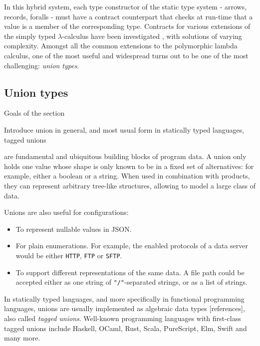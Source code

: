 \documentclass[sigplan,10pt,review,anonymous]{acmart}
\newcommand{\unsure}[2][1=]{}
\begin{document}
In this hybrid system, each type constructor of the static type system - arrows,
records, foralls - must have a contract counterpart that checks at run-time that
a value is a member of the corresponding type. Contracts for various
extensions of the simply typed $\lambda$-calculus have been investigated
\cite{BlameForAll, KeilThiemannUnionIntersection, RootCauseOfBlame,
DependentContracts, GradualTypingClasses}, with solutions of varying complexity.
Amongst all the common extensions to the polymorphic lambda calculus, one of the
most useful and widespread turns out to be one of the most challenging:
\emph{union types}.

\subsection{Union types}
{\color{red}Goals of the section

Introduce union in general, and most usual form in statically typed languages, tagged unions\vspace{0.5cm}}

 are fundamental and ubiquitous building blocks of program data. A union
only holds one value whose shape is only known to be in a fixed set of
alternatives: for example, either a boolean or a string. When used in combination
with products, they can represent arbitrary tree-like structures, allowing to
model a large class of data.

Unions are also useful for configurations:
\begin{itemize}
    \item To represent nullable values in JSON.
    \item For plain enumerations. For example, the enabled protocols of a data server
        would be either \lstinline+HTTP+, \lstinline+FTP+ or \lstinline+SFTP+.
    \item To support different representations of the same data. A file path could be
        accepted either as one string of \lstinline+"/"+-separated strings, or
        as a list of strings.
\end{itemize}

In statically typed languages, and more specifically in functional programming
languages, unions are usually implemented as algebraic data
types\unsure{This is a very misleading statement at best. Sums are
  "tagged union" sure, but that refers to an encoding a sums with
  unions, certainly not an encoding of unions with sums!} [references],
also called \emph{tagged unions}. Well-known programming languages with
first-class tagged unions include Haskell, OCaml, Rust, Scala, PureScript, Elm,
Swift and many more.
\end{document}
